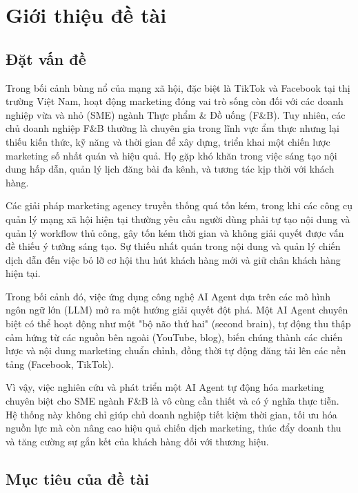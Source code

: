 \chapter{Giới thiệu đề
tài}\label{giux1edbi-thiux1ec7u-ux111ux1ec1-tuxe0i}

\section{Đặt vấn đề}\label{ux111ux1eb7t-vux1ea5n-ux111ux1ec1}

Trong bối cảnh bùng nổ của mạng xã hội, đặc biệt là TikTok và Facebook
tại thị trường Việt Nam, hoạt động marketing đóng vai trò sống còn đối
với các doanh nghiệp vừa và nhỏ (SME) ngành Thực phẩm \& Đồ uống (F\&B).
Tuy nhiên, các chủ doanh nghiệp F\&B thường là chuyên gia trong lĩnh vực
ẩm thực nhưng lại thiếu kiến thức, kỹ năng và thời gian để xây dựng,
triển khai một chiến lược marketing số nhất quán và hiệu quả. Họ gặp khó
khăn trong việc sáng tạo nội dung hấp dẫn, quản lý lịch đăng bài đa
kênh, và tương tác kịp thời với khách hàng.

Các giải pháp marketing agency truyền thống quá tốn kém, trong khi các
công cụ quản lý mạng xã hội hiện tại thường yêu cầu người dùng phải tự
tạo nội dung và quản lý workflow thủ công, gây tốn kém thời gian và
không giải quyết được vấn đề thiếu ý tưởng sáng tạo. Sự thiếu nhất quán
trong nội dung và quản lý chiến dịch dẫn đến việc bỏ lỡ cơ hội thu hút
khách hàng mới và giữ chân khách hàng hiện tại.

Trong bối cảnh đó, việc ứng dụng công nghệ AI Agent dựa trên các mô hình
ngôn ngữ lớn (LLM) mở ra một hướng giải quyết đột phá. Một AI Agent
chuyên biệt có thể hoạt động như một "bộ não thứ hai" (second brain), tự
động thu thập cảm hứng từ các nguồn bên ngoài (YouTube, blog), biến
chúng thành các chiến lược và nội dung marketing chuẩn chỉnh, đồng thời
tự động đăng tải lên các nền tảng (Facebook, TikTok).

Vì vậy, việc nghiên cứu và phát triển một AI Agent tự động hóa marketing
chuyên biệt cho SME ngành F\&B là vô cùng cần thiết và có ý nghĩa thực
tiễn. Hệ thống này không chỉ giúp chủ doanh nghiệp tiết kiệm thời gian,
tối ưu hóa nguồn lực mà còn nâng cao hiệu quả chiến dịch marketing, thúc
đẩy doanh thu và tăng cường sự gắn kết của khách hàng đối với thương
hiệu.

\section{Mục tiêu của đề
tài}\label{mux1ee5c-tiuxeau-cux1ee7a-ux111ux1ec1-tuxe0i}

